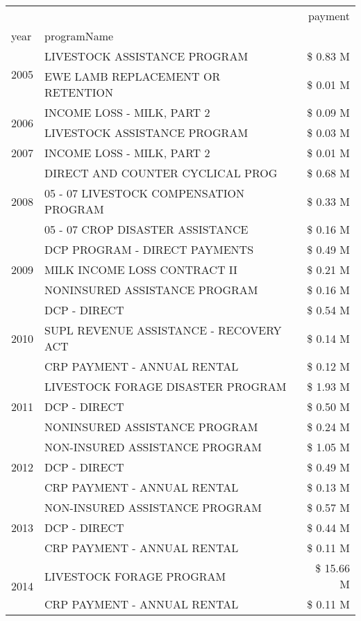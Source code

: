 \begin{tabular}{llr}
\toprule
 &  & payment \\
year & programName &  \\
\midrule
\multirow[t]{2}{*}{2005} & LIVESTOCK ASSISTANCE PROGRAM & \$ 0.83 M \\
 & EWE LAMB REPLACEMENT OR RETENTION & \$ 0.01 M \\
\cline{1-3}
\multirow[t]{2}{*}{2006} & INCOME LOSS - MILK, PART 2 & \$ 0.09 M \\
 & LIVESTOCK ASSISTANCE PROGRAM & \$ 0.03 M \\
\cline{1-3}
2007 & INCOME LOSS - MILK, PART 2 & \$ 0.01 M \\
\cline{1-3}
\multirow[t]{3}{*}{2008} & DIRECT AND COUNTER CYCLICAL PROG & \$ 0.68 M \\
 & 05 - 07 LIVESTOCK COMPENSATION PROGRAM & \$ 0.33 M \\
 & 05 - 07 CROP DISASTER ASSISTANCE & \$ 0.16 M \\
\cline{1-3}
\multirow[t]{3}{*}{2009} & DCP PROGRAM - DIRECT PAYMENTS & \$ 0.49 M \\
 & MILK INCOME LOSS CONTRACT II & \$ 0.21 M \\
 & NONINSURED ASSISTANCE PROGRAM & \$ 0.16 M \\
\cline{1-3}
\multirow[t]{3}{*}{2010} & DCP - DIRECT & \$ 0.54 M \\
 & SUPL REVENUE ASSISTANCE - RECOVERY ACT & \$ 0.14 M \\
 & CRP PAYMENT - ANNUAL RENTAL & \$ 0.12 M \\
\cline{1-3}
\multirow[t]{3}{*}{2011} & LIVESTOCK FORAGE DISASTER PROGRAM & \$ 1.93 M \\
 & DCP - DIRECT & \$ 0.50 M \\
 & NONINSURED ASSISTANCE PROGRAM & \$ 0.24 M \\
\cline{1-3}
\multirow[t]{3}{*}{2012} & NON-INSURED ASSISTANCE PROGRAM & \$ 1.05 M \\
 & DCP - DIRECT & \$ 0.49 M \\
 & CRP PAYMENT - ANNUAL RENTAL & \$ 0.13 M \\
\cline{1-3}
\multirow[t]{3}{*}{2013} & NON-INSURED ASSISTANCE PROGRAM & \$ 0.57 M \\
 & DCP - DIRECT & \$ 0.44 M \\
 & CRP PAYMENT - ANNUAL RENTAL & \$ 0.11 M \\
\cline{1-3}
\multirow[t]{3}{*}{2014} & LIVESTOCK FORAGE PROGRAM & \$ 15.66 M \\
 & CRP PAYMENT - ANNUAL RENTAL & \$ 0.11 M \\

\end{tabular}
